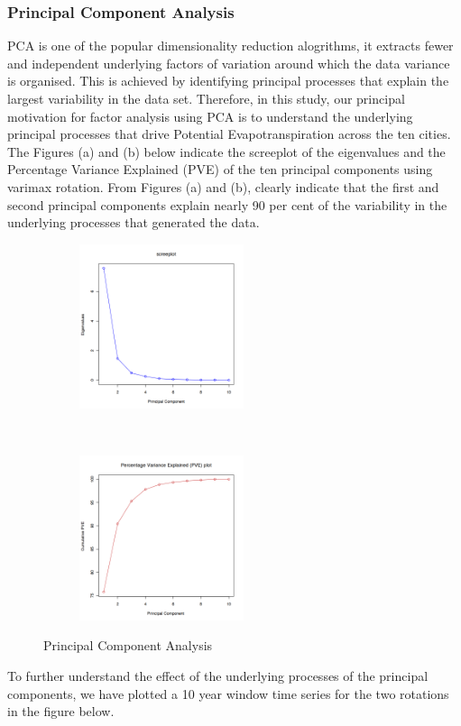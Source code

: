 \documentclass[12pt,a4paper]{article}
\begin{document}
\subsubsection{Principal Component Analysis}
PCA is one of the popular dimensionality reduction alogrithms,  it extracts fewer and independent underlying factors of variation around which the data variance is organised.  This is achieved by identifying principal processes that explain the largest variability in the data set. 
Therefore, in this study, our principal motivation for factor analysis using PCA is to understand the underlying principal processes that drive Potential Evapotranspiration across the ten cities. The Figures (a) and (b) below indicate the screeplot of the eigenvalues and the Percentage Variance Explained (PVE) of the ten principal components using varimax rotation.
From Figures (a) and (b),  clearly indicate that the first and second principal components explain nearly 90 per cent of the variability in  the underlying processes that generated the data.
\begin{figure}[!h]
    \centering
    \begin{subfigure}[t]{0.5\textwidth}
        \centering
        \includegraphics[height=1.9in]{./gaphics/q002_b.png}
        \caption{}
    \end{subfigure}%
    ~ 
    \begin{subfigure}[t]{0.5\textwidth}
        \centering
        \includegraphics[height=1.9in]{./gaphics/q002_c.png}
        \caption{}
    \end{subfigure}
    \caption{Principal Component Analysis}
\end{figure}
To further understand the effect of the underlying processes of the principal components, we have plotted a 10 year window time series for the two rotations in the figure below.
\end{document}
